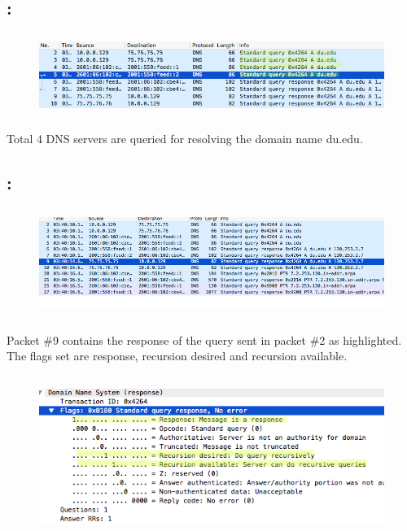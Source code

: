 \documentclass[]{report}
\begin{document}
\subsection{:}

\begin{figure}[H]
	\vspace{0pt}
	\includegraphics[height = 75pt, keepaspectratio]{Snapshots/q1/1_4.png}
\end{figure}
Total 4 DNS servers are queried for resolving the domain name du.edu.

\subsection{:}

\begin{figure}[H]
	\vspace{0pt}
	\includegraphics[height = 100pt, keepaspectratio]{Snapshots/q1/1_5_1.png}
\end{figure}

Packet \#9 contains the response of the query sent in packet \#2 as highlighted. The flags set are response, recursion desired and recursion available.

\begin{figure}[H]
	\vspace{0pt}
	\includegraphics[height = 150pt, keepaspectratio]{Snapshots/q1/1_5_2.png}
\end{figure}
\end{document}
